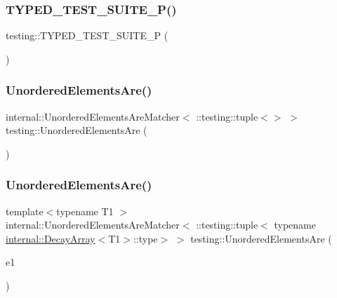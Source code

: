 \mbox{\label{namespacetesting_ab6095d387aee3b6b71919177827e78f5}} 
\subsubsection{\texorpdfstring{TYPED\_TEST\_SUITE\_P()}{TYPED\_TEST\_SUITE\_P()}}
{\footnotesize\ttfamily testing\+::\+T\+Y\+P\+E\+D\+\_\+\+T\+E\+S\+T\+\_\+\+S\+U\+I\+T\+E\+\_\+P (\begin{DoxyParamCaption}\item[{\mbox{\hyperlink{classtesting_1_1_code_location_for_t_y_p_e_d_t_e_s_t_p}{Code\+Location\+For\+T\+Y\+P\+E\+D\+T\+E\+S\+TP}}}]{ }\end{DoxyParamCaption})}

\mbox{\label{namespacetesting_a8622c12aadfa0e60f7d68683eeb21115}} 
\subsubsection{\texorpdfstring{UnorderedElementsAre()}{UnorderedElementsAre()}\hspace{0.1cm}{\footnotesize\ttfamily [1/11]}}
{\footnotesize\ttfamily internal\+::\+Unordered\+Elements\+Are\+Matcher$<$ \+::testing\+::tuple$<$$>$ $>$ testing\+::\+Unordered\+Elements\+Are (\begin{DoxyParamCaption}{ }\end{DoxyParamCaption})\hspace{0.3cm}{\ttfamily [inline]}}

\mbox{\label{namespacetesting_a0b81dd5584a3588cc2516b29ef166b7d}} 
\subsubsection{\texorpdfstring{UnorderedElementsAre()}{UnorderedElementsAre()}\hspace{0.1cm}{\footnotesize\ttfamily [2/11]}}
{\footnotesize\ttfamily template$<$typename T1 $>$ \\
internal\+::\+Unordered\+Elements\+Are\+Matcher$<$ \+::testing\+::tuple$<$ typename \mbox{\hyperlink{structtesting_1_1internal_1_1_decay_array}{internal\+::\+Decay\+Array}}$<$T1$>$\+::type$>$ $>$ testing\+::\+Unordered\+Elements\+Are (\begin{DoxyParamCaption}\item[{const T1 \&}]{e1 }\end{DoxyParamCaption})\hspace{0.3cm}{\ttfamily [inline]}}


